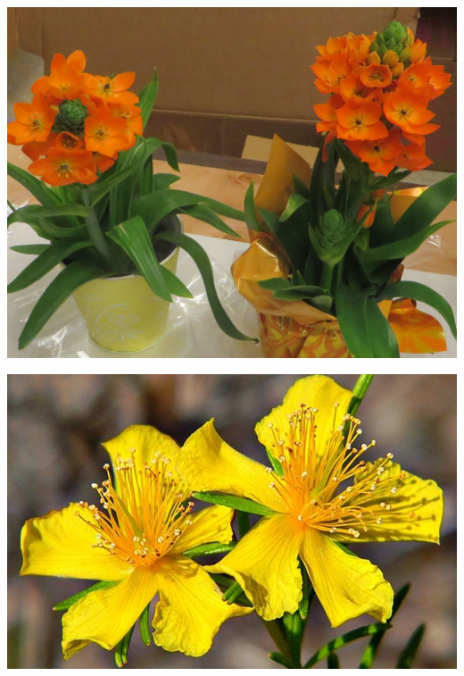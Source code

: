 \documentclass{article}
\begin{document}
\begin{center}
\includegraphics[height=0.925\paperheight]{../StarOfBethlehem.jpg}
\end{center}
\newpage

\begin{center}
\includegraphics[height=0.925\paperheight]{../StJohnsWort.jpg}
\end{center}
\newpage
\end{document}
